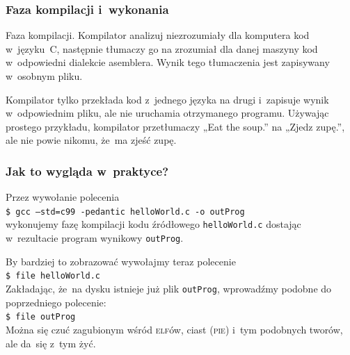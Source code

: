 \documentclass[10pt,t]{beamer}
\begin{document}
\begin{frame}
  \frametitle{Faza kompilacji i~wykonania}


  \alert{Faza kompilacji.} Kompilator analizuj niezrozumiały dla komputera
  kod w~języku~C, następnie tłumaczy go na zrozumiał dla danej maszyny kod
  w~odpowiedni dialekcie asemblera. Wynik tego tłumaczenia jest zapisywany
  w~osobnym pliku.

  Kompilator \alert{tylko} przekłada kod z~jednego języka na drugi
  i~zapisuje wynik w~odpowiednim pliku, ale \alert{nie} uruchamia
  otrzymanego programu. Używając prostego przykładu, kompilator
  przetłumaczy „Eat the soup.” na „Zjedz zupę.”, ale nie powie nikomu,
  że~ma zjeść zupę.%


\end{frame}






\begin{frame}
  \frametitle{Jak to wygląda w~praktyce?}


  Przez wywołanie polecenia \\
  \texttt{\$ gcc --std=c99 -pedantic helloWorld.c -o outProg} \\
  wykonujemy fazę kompilacji kodu źródłowego \texttt{helloWorld.c}
  dostając w~rezultacie program wynikowy \texttt{outProg}.

  By bardziej to zobrazować wywołajmy teraz polecenie \\
  \texttt{\$ file helloWorld.c} \\
  Zakładając, że~na dysku istnieje już plik \texttt{outProg}, wprowadźmy
  podobne do poprzedniego polecenie: \\
  \texttt{\$ file outProg} \\
  Można się czuć zagubionym wśród \textsc{elf}ów, ciast (\textsc{pie})
  i~tym podobnych tworów, ale da~się z~tym żyć.


\end{frame}
\end{document}
